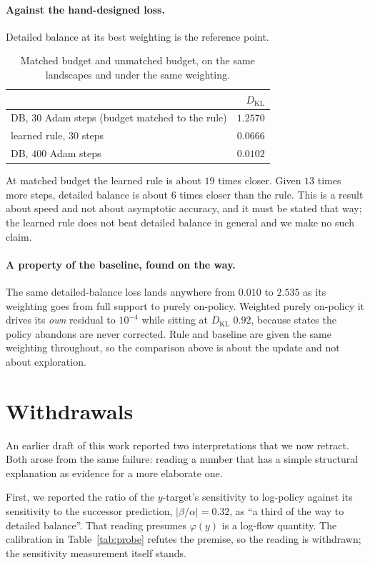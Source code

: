 \documentclass[11pt]{article}
\theoremstyle{remark}
\newcommand{\KL}{D_{\mathrm{KL}}}
\begin{document}
\paragraph{Against the hand-designed loss.} Detailed balance at its best
weighting is the reference point.

\begin{table}[t]
\centering
\begin{tabular}{lr}
\toprule
 & $\KL$ \\
\midrule
DB, $30$ Adam steps (budget matched to the rule) & $1.2570$ \\
learned rule, $30$ steps & $\mathbf{0.0666}$ \\
DB, $400$ Adam steps & $0.0102$ \\
\bottomrule
\end{tabular}
\caption{Matched budget and unmatched budget, on the same landscapes and under
the same weighting.}
\label{tab:db}
\end{table}

At matched budget the learned rule is about $19$ times closer. Given $13$ times
more steps, detailed balance is about $6$ times closer than the rule. This is a
result about speed and not about asymptotic accuracy, and it must be stated that
way; the learned rule does not beat detailed balance in general and we make no
such claim.

\paragraph{A property of the baseline, found on the way.} The same
detailed-balance loss lands anywhere from $0.010$ to $2.535$ as its weighting
goes from full support to purely on-policy. Weighted purely on-policy it drives
its \emph{own} residual to $10^{-4}$ while sitting at $\KL$ $0.92$, because
states the policy abandons are never corrected. Rule and baseline are given the
same weighting throughout, so the comparison above is about the update and not
about exploration.

\section{Withdrawals}\label{sec:withdrawals}

An earlier draft of this work reported two interpretations that we now retract.
Both arose from the same failure: reading a number that has a simple structural
explanation as evidence for a more elaborate one.

First, we reported the ratio of the $y$-target's sensitivity to log-policy against
its sensitivity to the successor prediction, $|\beta/\alpha| = 0.32$, as ``a third
of the way to detailed balance''. That reading presumes $\varphi(y)$ is a
log-flow quantity. The calibration in Table~\ref{tab:probe} refutes the premise,
so the reading is withdrawn; the sensitivity measurement itself stands.
\end{document}
